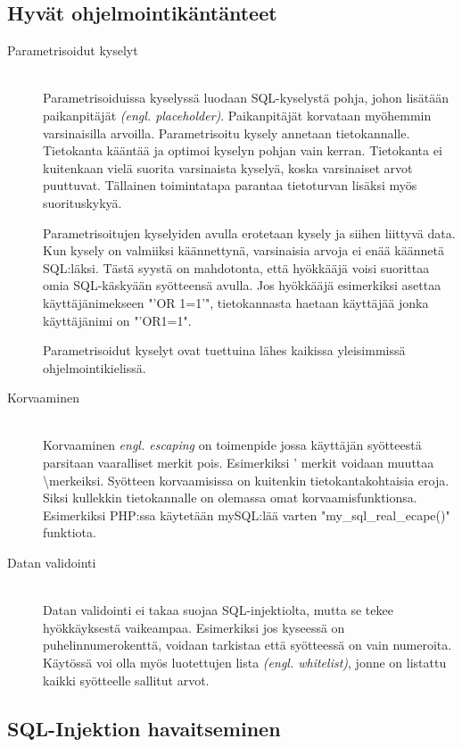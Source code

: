 \documentclass[finnish]{tktltiki2}
\theoremstyle{definition}
\theoremstyle{remark}
\begin{document}
\subsection{Hyvät ohjelmointikäntänteet}
\begin{description}
\item[Parametrisoidut kyselyt ] \hfill \\
Parametrisoiduissa kyselyssä luodaan SQL-kyselystä pohja, johon lisätään paikanpitäjät \textit{(engl. placeholder)}. Paikanpitäjät korvataan myöhemmin varsinaisilla arvoilla. Parametrisoitu kysely annetaan tietokannalle. Tietokanta kääntää ja optimoi kyselyn pohjan vain kerran. Tietokanta ei kuitenkaan vielä suorita varsinaista kyselyä, koska varsinaiset arvot puuttuvat. Tällainen toimintatapa parantaa tietoturvan lisäksi myös suorituskykyä.

Parametrisoitujen kyselyiden avulla erotetaan kysely ja siihen liittyvä data. Kun kysely on valmiiksi käännettynä, varsinaisia arvoja ei enää käännetä SQL:läksi. Tästä syystä on mahdotonta, että hyökkääjä voisi suorittaa omia SQL-käskyään syötteensä avulla. Jos hyökkääjä esimerkiksi asettaa käyttäjänimekseen "'OR 1=1'", tietokannasta haetaan käyttäjää jonka käyttäjänimi on "'OR1=1".

Parametrisoidut kyselyt ovat tuettuina lähes kaikissa yleisimmissä ohjelmointikielissä.

\item[Korvaaminen] \hfill \\
Korvaaminen \textit{engl. escaping} on toimenpide jossa käyttäjän syötteestä parsitaan vaaralliset merkit pois. Esimerkiksi ' merkit voidaan muuttaa \textbackslash merkeiksi. Syötteen korvaamisissa on kuitenkin tietokantakohtaisia eroja. Siksi kullekkin tietokannalle on olemassa omat korvaamisfunktionsa. Esimerkiksi PHP:ssa käytetään mySQL:lää varten "my{\_}sql{\_}real{\_}ecape()" funktiota.

\item[Datan validointi]\hfill \\
Datan validointi ei takaa suojaa SQL-injektiolta, mutta se tekee hyökkäyksestä vaikeampaa. Esimerkiksi jos kyseessä on puhelinnumerokenttä, voidaan tarkistaa että syötteessä on vain numeroita. Käytössä voi olla myös luotettujen lista \textit{(engl. whitelist)}, jonne on listattu kaikki syötteelle sallitut arvot.

\end{description}
\pagebreak
\subsection{SQL-Injektion havaitseminen}
\end{document}
